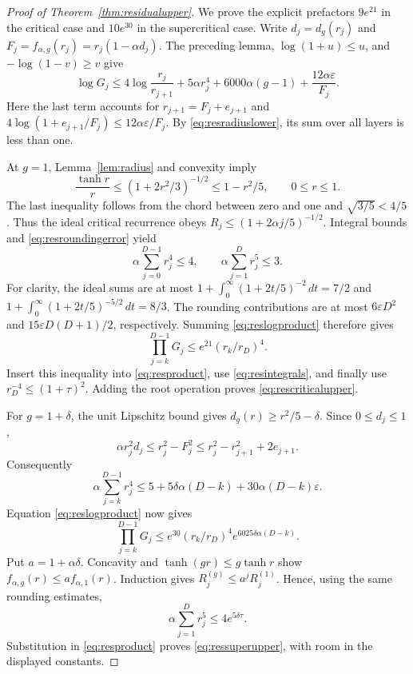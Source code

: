 \begin{proof}[Proof of Theorem~\ref{thm:residualupper}]
We prove the explicit prefactors $9e^{21}$ in the critical case
and $10e^{30}$ in the supercritical case.
Write $d_j=d_g(r_j)$ and
$F_j=f_{\alpha,g}(r_j)=r_j(1-\alpha d_j)$.
The preceding lemma, $\log(1+u)\le u$, and
$-\log(1-v)\ge v$ give
\begin{equation}\label{eq:reslogproduct}
\log G_j\le
4\log\frac{r_j}{r_{j+1}}+5\alpha r_j^4
+6000\alpha(g-1)+\frac{12\alpha\varepsilon}{F_j}.
\end{equation}
Here the last term accounts for
$r_{j+1}=F_j+e_{j+1}$ and
$4\log(1+e_{j+1}/F_j)\le12\alpha\varepsilon/F_j$.
By \eqref{eq:resradiuslower}, its sum over all layers is less than
one.

At $g=1$, Lemma~\ref{lem:radius} and convexity imply
\[
\frac{\tanh r}{r}\le(1+2r^2/3)^{-1/2}\le1-r^2/5,
\qquad 0\le r\le1.
\]
The last inequality follows from the chord between zero and one
and $\sqrt{3/5}<4/5$.
Thus the ideal critical recurrence obeys
$R_j\le(1+2\alpha j/5)^{-1/2}$.
Integral bounds and \eqref{eq:resroundingerror} yield
\begin{equation}\label{eq:resintegrals}
\alpha\sum_{j=0}^{D-1}r_j^4\le4,
\qquad
\alpha\sum_{j=1}^{D}r_j^5\le3.
\end{equation}
For clarity, the ideal sums are at most
$1+\int_0^\infty(1+2t/5)^{-2}\,dt=7/2$ and
$1+\int_0^\infty(1+2t/5)^{-5/2}\,dt=8/3$.
The rounding contributions are at most
$6\varepsilon D^2$ and $15\varepsilon D(D+1)/2$, respectively.
Summing \eqref{eq:reslogproduct} therefore gives
\[
\prod_{j=k}^{D-1}G_j\le e^{21}(r_k/r_D)^4.
\]
Insert this inequality into \eqref{eq:resproduct}, use
\eqref{eq:resintegrals}, and finally use
$r_D^{-4}\le(1+\tau)^2$. Adding the root operation proves
\eqref{eq:rescriticalupper}.

For $g=1+\delta$, the unit Lipschitz bound gives
$d_g(r)\ge r^2/5-\delta$. Since $0\le d_j\le1$,
\[
\alpha r_j^2d_j\le r_j^2-F_j^2
\le r_j^2-r_{j+1}^2+2e_{j+1}.
\]
Consequently
\[
\alpha\sum_{j=k}^{D-1}r_j^4
\le5+5\delta\alpha(D-k)+30\alpha(D-k)\varepsilon.
\]
Equation \eqref{eq:reslogproduct} now gives
\[
\prod_{j=k}^{D-1}G_j
\le e^{30}(r_k/r_D)^4
       e^{6025\delta\alpha(D-k)}.
\]
Put $a=1+\alpha\delta$. Concavity and
$\tanh(gr)\le g\tanh r$ show
$f_{\alpha,g}(r)\le a f_{\alpha,1}(r)$.
Induction gives $R_j^{(g)}\le a^jR_j^{(1)}$.
Hence, using the same rounding estimates,
\[
\alpha\sum_{j=1}^D r_j^5\le4e^{5\delta\tau}.
\]
Substitution in \eqref{eq:resproduct} proves
\eqref{eq:ressuperupper}, with room in the displayed constants.


\end{proof}
